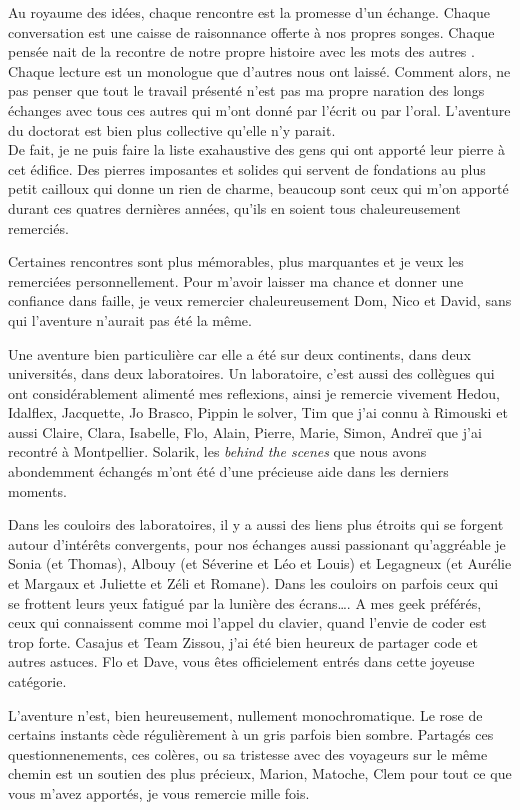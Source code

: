 Au royaume des idées, chaque rencontre est la promesse d'un échange.
Chaque conversation est une caisse de raisonnance offerte à nos propres
songes. Chaque pensée nait de la recontre de notre propre histoire avec
les mots des autres . Chaque lecture est un monologue que d'autres nous
ont laissé. Comment alors, ne pas penser que tout le travail présenté
n'est pas ma propre naration des longs échanges avec tous ces autres qui
m'ont donné par l'écrit ou par l'oral. L'aventure du doctorat est bien
plus collective qu'elle n'y parait.\\
De fait, je ne puis faire la liste exahaustive des gens qui ont apporté
leur pierre à cet édifice. Des pierres imposantes et solides qui servent
de fondations au plus petit cailloux qui donne un rien de charme,
beaucoup sont ceux qui m'on apporté durant ces quatres dernières années,
qu'ils en soient tous chaleureusement remerciés.

Certaines rencontres sont plus mémorables, plus marquantes et je veux
les remerciées personnellement. Pour m'avoir laisser ma chance et donner
une confiance dans faille, je veux remercier chaleureusement Dom, Nico
et David, sans qui l'aventure n'aurait pas été la même.

Une aventure bien particulière car elle a été sur deux continents, dans
deux universités, dans deux laboratoires. Un laboratoire, c'est aussi
des collègues qui ont considérablement alimenté mes reflexions, ainsi je
remercie vivement Hedou, Idalflex, Jacquette, Jo Brasco, Pippin le
solver, Tim que j'ai connu à Rimouski et aussi Claire, Clara, Isabelle,
Flo, Alain, Pierre, Marie, Simon, Andreï que j'ai recontré à
Montpellier. Solarik, les \emph{behind the scenes} que nous avons
abondemment échangés m'ont été d'une précieuse aide dans les derniers
moments.

Dans les couloirs des laboratoires, il y a aussi des liens plus étroits
qui se forgent autour d'intérêts convergents, pour nos échanges aussi
passionant qu'aggréable je Sonia (et Thomas), Albouy (et Séverine et Léo
et Louis) et Legagneux (et Aurélie et Margaux et Juliette et Zéli et
Romane). Dans les couloirs on parfois ceux qui se frottent leurs yeux
fatigué par la lunière des écrans\ldots{}. A mes geek préférés, ceux qui
connaissent comme moi l'appel du clavier, quand l'envie de coder est
trop forte. Casajus et Team Zissou, j'ai été bien heureux de partager
code et autres astuces. Flo et Dave, vous êtes officielement entrés dans
cette joyeuse catégorie.

L'aventure n'est, bien heureusement, nullement monochromatique. Le rose
de certains instants cède régulièrement à un gris parfois bien sombre.
Partagés ces questionnenements, ces colères, ou sa tristesse avec des
voyageurs sur le même chemin est un soutien des plus précieux, Marion,
Matoche, Clem pour tout ce que vous m'avez apportés, je vous remercie
mille fois.

